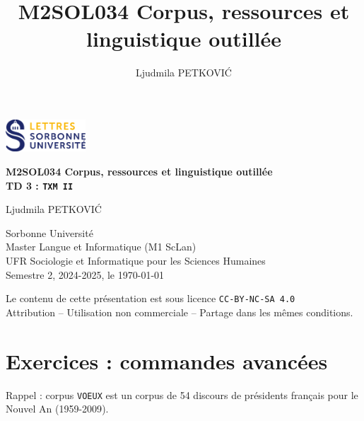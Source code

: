 \documentclass[xcolor={table,usenames,dvipsnames}]{article}
\author{Ljudmila PETKOVI\'C}
\title{\textbf{\textsc{M2SOL034} Corpus, ressources et linguistique outillée}}
\begin{document}
	
	\begin{center}
		\includegraphics[width=3cm]{img/logo.png} %
	\end{center}
	
	\begin{tcolorbox}[colback=myblue!10, colframe=myblue, width=\textwidth, sharp corners, boxrule=1pt]
		\centering
		\Large \textbf{\textsc{M2SOL034} Corpus, ressources et linguistique outillée\\{\large\textsc{TD 3} : \texttt{TXM II}}}
	\end{tcolorbox}
	
	\begin{center}
		Ljudmila PETKOVI\'C
		
		{\small Sorbonne Université\\Master \og{}Langue et Informatique\fg{} (\textsc{M1} ScLan)\\\textsc{UFR} Sociologie et Informatique pour les Sciences Humaines\\Semestre 2, 2024-2025, le \today}
		
		
		{\scriptsize Le contenu de cette présentation est sous licence \texttt{CC-BY-NC-SA 4.0}\\Attribution -- Utilisation non commerciale -- Partage dans les mêmes conditions.\\}
		\href{https://creativecommons.org/licenses/by-nc-sa/4.0/deed.fr}{\ccbyncsa}
	\end{center}
	
\hline

		
	\tableofcontents
	
	\bigskip
	
	\section{Exercices : commandes avancées}  %
	Rappel : corpus \texttt{VOEUX} est un corpus de 54 discours de présidents français pour le Nouvel An (\textsc{1959-2009}).
	
\end{document}
